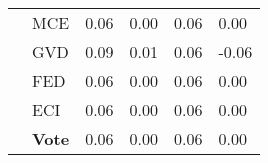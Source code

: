 \begin{tabularx}{\linewidth}{*{6}{X}}
 & MCE & {\cellcolor[HTML]{DFECF7}} \color[HTML]{000000} 0.06 & {\cellcolor[HTML]{FFFFFF}} \color[HTML]{000000} 0.00  & {\cellcolor[HTML]{DFECF7}} \color[HTML]{000000} 0.06 & {\cellcolor[HTML]{FFFFFF}} \color[HTML]{000000} 0.00 \\
 & GVD & {\cellcolor[HTML]{D4E4F4}} \color[HTML]{000000} 0.09 & {\cellcolor[HTML]{FDFEFD}} \color[HTML]{000000} 0.01  & {\cellcolor[HTML]{DFECF7}} \color[HTML]{000000} 0.06 & {\cellcolor[HTML]{FFE0E0}} \color[HTML]{000000} -0.06 \\
 & FED & {\cellcolor[HTML]{DFECF7}} \color[HTML]{000000} 0.06 & {\cellcolor[HTML]{FFFFFF}} \color[HTML]{000000} 0.00  & {\cellcolor[HTML]{DFECF7}} \color[HTML]{000000} 0.06 & {\cellcolor[HTML]{FFFFFF}} \color[HTML]{000000} 0.00 \\
 & ECI & {\cellcolor[HTML]{DFECF7}} \color[HTML]{000000} 0.06 & {\cellcolor[HTML]{FFFFFF}} \color[HTML]{000000} 0.00  & {\cellcolor[HTML]{DFECF7}} \color[HTML]{000000} 0.06 & {\cellcolor[HTML]{FFFFFF}} \color[HTML]{000000} 0.00 \\
 & \textbf{Vote} & {\cellcolor[HTML]{DFECF7}} \color[HTML]{000000} 0.06 & {\cellcolor[HTML]{FFFFFF}} \color[HTML]{000000} 0.00  & {\cellcolor[HTML]{DFECF7}} \color[HTML]{000000} 0.06 & {\cellcolor[HTML]{FFFFFF}} \color[HTML]{000000} 0.00 \\
\bottomrule
\end{tabularx}
